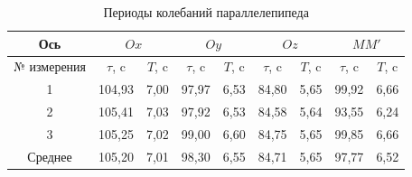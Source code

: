 \documentclass[a4paper, 12pt]{article}
\begin{document}
        \begin{table}
            \centering
            \caption{Периоды колебаний параллелепипеда}
            \begin{tabular}{|c|cc|cc|cc|cc|}
                \hline
                Ось
                & \multicolumn{2}{c|}{$Ox$}
                & \multicolumn{2}{c|}{$Oy$}
                & \multicolumn{2}{c|}{$Oz$}
                & \multicolumn{2}{c|}{$MM'$}
                \\
                \hline
                № измерения
                & \multicolumn{1}{c|}{$\tau$, c} & $T$, c
                & \multicolumn{1}{c|}{$\tau$, c} & $T$, c
                & \multicolumn{1}{c|}{$\tau$, c} & $T$, c
                & \multicolumn{1}{c|}{$\tau$, c} & $T$, c \\
                \hline
                1
                & \multicolumn{1}{c|}{104,93} & 7,00
                & \multicolumn{1}{c|}{97,97} & 6,53
                & \multicolumn{1}{c|}{84,80} & 5,65
                & \multicolumn{1}{c|}{99,92} & 6,66 \\
                \hline
                2
                & \multicolumn{1}{c|}{105,41} & 7,03
                & \multicolumn{1}{c|}{97,92} & 6,53
                & \multicolumn{1}{c|}{84,58} & 5,64
                & \multicolumn{1}{c|}{93,55} & 6,24 \\
                \hline
                3
                & \multicolumn{1}{c|}{105,25} & 7,02
                & \multicolumn{1}{c|}{99,00} & 6,60
                & \multicolumn{1}{c|}{84,75} & 5,65
                & \multicolumn{1}{c|}{99,85} & 6,66 \\
                \hline
                Среднее
                & \multicolumn{1}{c|}{105,20} & 7,01
                & \multicolumn{1}{c|}{98,30} & 6,55
                & \multicolumn{1}{c|}{84,71} & 5,65
                & \multicolumn{1}{c|}{97,77} & 6,52 \\
                \hline
            \end{tabular}
        \end{table}
\end{document}
